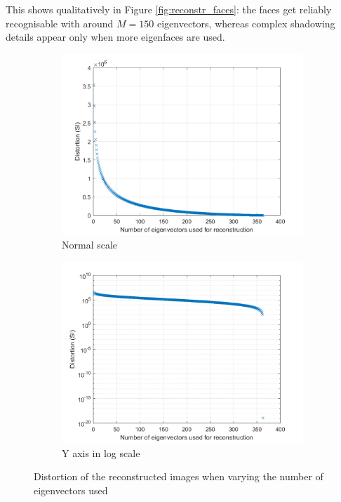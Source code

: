 \documentclass[10pt,technote]{IEEEtran}
\begin{document}
This shows qualitatively in Figure \ref{fig:reconstr_faces}: the faces get reliably recognisable with around $M =150$ eigenvectors, whereas complex shadowing details appear only when more eigenfaces are used.
\begin{figure}[htb!]
    \centering
    \begin{subfigure}[b]{\linewidth}
        \includegraphics[width=\textwidth]{../results/ex1aa/dist_plot.png}
        \caption{Normal scale}
        
        \quad
    \end{subfigure}
    \begin{subfigure}[b]{\linewidth}
        \includegraphics[width=\textwidth]{../results/ex1aa/dist_logplot.png}
        \caption{Y axis in log scale}
        
        \quad
    \end{subfigure}
    \caption{Distortion of the reconstructed images when varying the number of eigenvectors used}
    \label{fig:distortion}
\end{figure}
\end{document}
